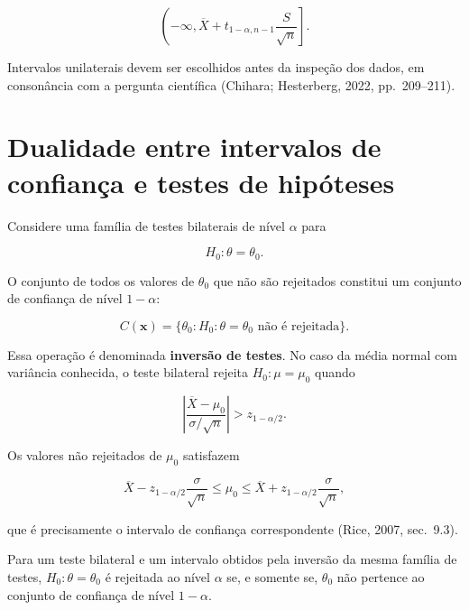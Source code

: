 \documentclass[
  letterpaper,
  DIV=11,
  numbers=noendperiod]{scrreprt}
\begin{document}
\[\left(
-\infty,
\overline X+t_{1-\alpha,n-1}\frac{S}{\sqrt n}
\right].\]

Intervalos unilaterais devem ser escolhidos antes da inspeção dos dados,
em consonância com a pergunta científica (Chihara; Hesterberg, 2022,
pp.~209--211).

\section{Dualidade entre intervalos de confiança e testes de
hipóteses}\label{dualidade-entre-intervalos-de-confianuxe7a-e-testes-de-hipuxf3teses}

Considere uma família de testes bilaterais de nível \(\alpha\) para

\[H_0:\theta=\theta_0.\]

O conjunto de todos os valores de \(\theta_0\) que não são rejeitados
constitui um conjunto de confiança de nível \(1-\alpha\):

\[C(\mathbf{x})=
\{\theta_0:\text{$H_0:\theta=\theta_0$ não é rejeitada}\}.\]

Essa operação é denominada \textbf{inversão de testes}. No caso da média
normal com variância conhecida, o teste bilateral rejeita
\(H_0:\mu=\mu_0\) quando

\[\left|
\frac{\overline X-\mu_0}{\sigma/\sqrt n}
\right|>z_{1-\alpha/2}.\]

Os valores não rejeitados de \(\mu_0\) satisfazem

\[\overline X-z_{1-\alpha/2}\frac{\sigma}{\sqrt n}
\leq \mu_0\leq
\overline X+z_{1-\alpha/2}\frac{\sigma}{\sqrt n},\]

que é precisamente o intervalo de confiança correspondente (Rice, 2007,
sec.~9.3).

\begin{tcolorbox}[enhanced jigsaw, colback=white, leftrule=.75mm, colbacktitle=quarto-callout-important-color!10!white, breakable, titlerule=0mm, bottomtitle=1mm, title=\textcolor{quarto-callout-important-color}{\faExclamation}\hspace{0.5em}{Consequência}, colframe=quarto-callout-important-color-frame, toprule=.15mm, opacityback=0, bottomrule=.15mm, opacitybacktitle=0.6, arc=.35mm, toptitle=1mm, rightrule=.15mm, coltitle=black, left=2mm]

Para um teste bilateral e um intervalo obtidos pela inversão da mesma
família de testes, \(H_0:\theta=\theta_0\) é rejeitada ao nível
\(\alpha\) se, e somente se, \(\theta_0\) não pertence ao conjunto de
confiança de nível \(1-\alpha\).

\end{tcolorbox}
\end{document}
